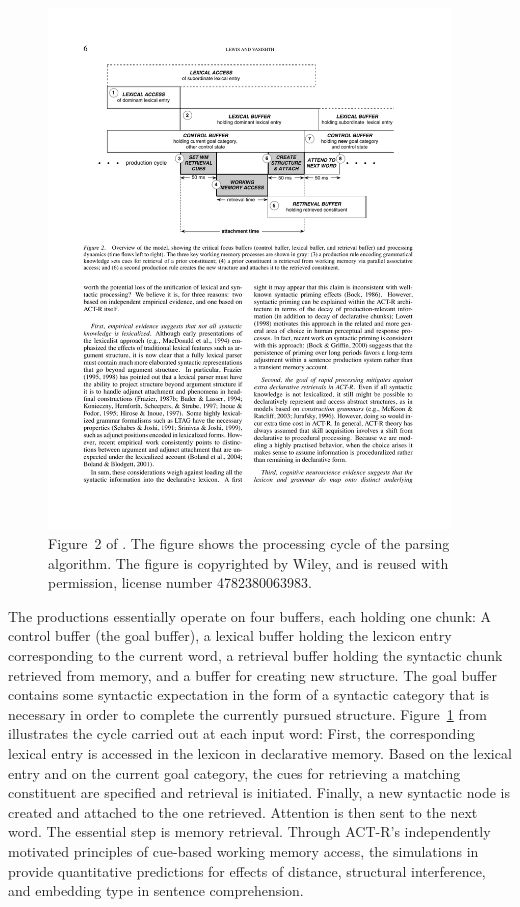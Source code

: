 \documentclass{cambridge7A}\usepackage[]{graphicx}\usepackage[]{color}
\begin{document}
\begin{figure}[htb]
	\centering
	\includegraphics[width=0.95\textwidth]{figures/lv05-fig2-buffers}
	\caption{Figure~2 of \cite{LewisVasishth2005}. The figure shows the processing cycle of the parsing algorithm. The figure is copyrighted by Wiley, and is reused with permission, license number 4782380063983.}
	\label{fig:lv05buffers}
\end{figure}

The productions essentially operate on four buffers, each holding one chunk: A control buffer (the goal buffer), a lexical buffer holding the lexicon entry corresponding to the current word, a retrieval buffer holding the syntactic chunk retrieved from memory, and a buffer for creating new structure. The goal buffer contains some syntactic expectation in the form of a syntactic category that is necessary in order to complete the currently pursued structure.
Figure~\ref{fig:lv05buffers} from \cite{LewisVasishth2005} illustrates the cycle carried out at each input word: First, the corresponding lexical entry is accessed in the lexicon in  declarative memory. Based on the lexical entry and on the current goal category, the cues for retrieving a matching constituent are specified and retrieval is initiated. Finally, a new syntactic node is created and attached to the one retrieved. Attention is then sent to the next word. The essential step is memory retrieval. Through ACT-R's independently motivated principles of cue-based working memory access, the simulations in \cite{LewisVasishth2005} provide quantitative predictions for  effects of distance, structural interference, and embedding type in sentence comprehension.
\end{document}
